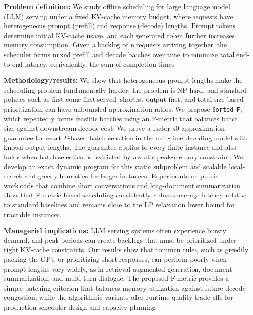 \documentclass[nonblindrev]{informs3_hide}
\newcommand{\sortF}{\texttt{Sorted-F}}
\begin{document}
{\noindent\textbf{Problem definition:}
We study offline scheduling for large language model (LLM) serving under a fixed KV-cache memory budget, where requests have heterogeneous prompt (prefill) and response (decode) lengths. Prompt tokens determine initial KV-cache usage, and each generated token further increases memory consumption. Given a backlog of n requests arriving together, the scheduler forms mixed prefill and decode batches over time to minimize total end-to-end latency, equivalently, the sum of completion times.

\noindent\textbf{Methodology/results:}
We show that heterogeneous prompt lengths make the scheduling problem fundamentally harder: the problem is NP-hard, and standard policies such as first-come-first-served, shortest-output-first, and total-size-based prioritization can have unbounded approximation ratios. We propose \sortF, which repeatedly forms feasible batches using an F-metric that balances batch size against downstream decode cost. 
We prove a factor-$40$ approximation guarantee for exact $F$-based batch selection in the unit-time decoding model with known output lengths. The guarantee applies to every finite instance and also holds when batch selection is restricted by a static peak-memory constraint. We develop an exact dynamic program for this static subproblem and scalable local-search and greedy heuristics for larger instances.
Experiments on public workloads that combine short conversations and long-document summarization show that F-metric-based scheduling consistently reduces average latency relative to standard baselines and remains close to the LP relaxation lower bound for tractable instances.

\noindent\textbf{Managerial implications:}
LLM serving systems often experience bursty demand, and peak periods can create backlogs that must be prioritized under tight KV-cache constraints. Our results show that common rules, such as greedily packing the GPU or prioritizing short responses, can perform poorly when prompt lengths vary widely, as in retrieval-augmented generation, document summarization, and multi-turn dialogue. The proposed F-metric provides a simple batching criterion that balances memory utilization against future decode congestion, while the algorithmic variants offer runtime-quality trade-offs for production scheduler design and capacity planning.

}
\end{document}
